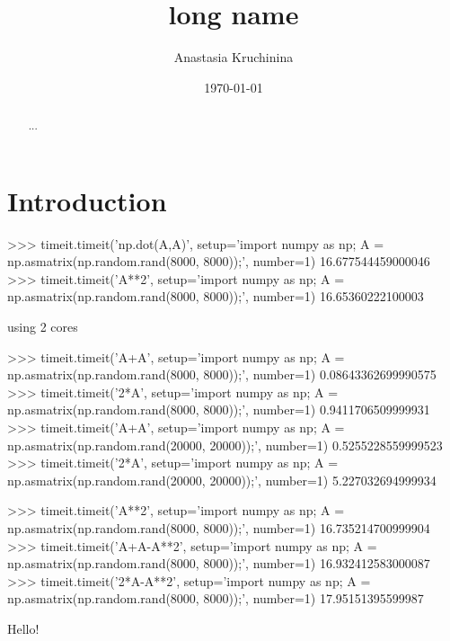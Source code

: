 \documentclass{amsart}
\title[short name]{long name}
\author{Anastasia Kruchinina}
\date{\today}
\begin{document}
\begin{abstract}
...
\end{abstract}
\maketitle

\tableofcontents


\section{Introduction}


>>> timeit.timeit('np.dot(A,A)', setup='import numpy as np; A = np.asmatrix(np.random.rand(8000, 8000));', number=1)
16.677544459000046
>>> timeit.timeit('A**2', setup='import numpy as np; A = np.asmatrix(np.random.rand(8000, 8000));', number=1)
16.65360222100003

using 2 cores







>>> timeit.timeit('A+A', setup='import numpy as np; A = np.asmatrix(np.random.rand(8000, 8000));', number=1)
0.08643362699990575
>>> timeit.timeit('2*A', setup='import numpy as np; A = np.asmatrix(np.random.rand(8000, 8000));', number=1)
0.9411706509999931
>>> timeit.timeit('A+A', setup='import numpy as np; A = np.asmatrix(np.random.rand(20000, 20000));', number=1)
0.5255228559999523
>>> timeit.timeit('2*A', setup='import numpy as np; A = np.asmatrix(np.random.rand(20000, 20000));', number=1)
5.227032694999934


>>> timeit.timeit('A**2', setup='import numpy as np; A = np.asmatrix(np.random.rand(8000, 8000));', number=1)
16.735214700999904
>>> timeit.timeit('A+A-A**2', setup='import numpy as np; A = np.asmatrix(np.random.rand(8000, 8000));', number=1)
16.932412583000087
>>> timeit.timeit('2*A-A**2', setup='import numpy as np; A = np.asmatrix(np.random.rand(8000, 8000));', number=1)
17.95151395599987




Hello!~\cite{Label}

\end{document}
